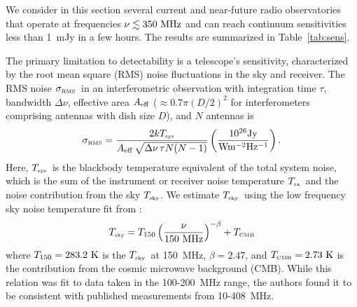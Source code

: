 \documentclass[iop,numberedappendix,apj,twocolappendix,]{emulateapj}
\newcommand{\Tcmb}{\mbox{$T_{\mbox{\tiny CMB}}$}}
\newcommand{\Tsky}{\mbox{$T_{\mbox{\tiny sky}}$}}
\newcommand{\Tsys}{\mbox{$T_{\mbox{\tiny sys}}$}}
\newcommand{\Trx}{\mbox{$T_{\mbox{\tiny rx}}$}}
\newcommand{\sigRMS}{\mbox{$\sigma_{\mbox{\tiny RMS}}$}}
\begin{document}
We consider in this section several current and near-future radio observatories that operate at frequencies $\nu \lesssim 350~\rm MHz$ and can reach continuum sensitivities less than 1~mJy in a few hours.
The results are summarized in Table~\ref{tab:sens}. 

The primary limitation to detectability is a telescope's sensitivity, characterized by the root mean square (RMS) noise fluctuations in the sky and receiver.
The RMS noise \sigRMS\ in an interferometric observation with integration time $\tau$, bandwidth $\Delta \nu$, effective area $A_{\rm eff}$ ($\approx0.7 \pi (D/2)^2$ for interferometers comprising antennas with dish size $D$), and $N$ antennas is \citep[see e.g.][]{condon+ransom2016}
\begin{equation}
\sigRMS = \frac{2 k \Tsys}{A_{\rm eff} \, \sqrt{\Delta \nu \, \tau N (N-1)}} 
\left(\frac{\rm 10^{26} Jy}{\rm W m^{-2} Hz^{-1}}\right).
\label{eq:rms_sens}
\end{equation}
Here, \Tsys\ is the blackbody temperature equivalent of the total system noise, which is the sum of the instrument or receiver noise temperature \Trx\ and the noise contribution from the sky \Tsky.
We estimate \Tsky\ using the low frequency sky noise temperature fit from \cite{Rogers+Bowman2008}:
\begin{equation}
\Tsky = T_{150} \left( \frac{\nu}{150~\rm MHz}\right)^{-\beta} + \Tcmb
\label{eq:Tsky}
\end{equation}
where $T_{150} = 283.2~\rm K$ is the \Tsky\ at 150~MHz, $\beta=2.47$, and $\Tcmb = 2.73~\rm K$ is the contribution from the cosmic microwave background (CMB).
While this relation was fit to data taken in the 100-200~MHz range, the authors found it to be consistent with published measurements from 10-408~MHz. 
\end{document}
